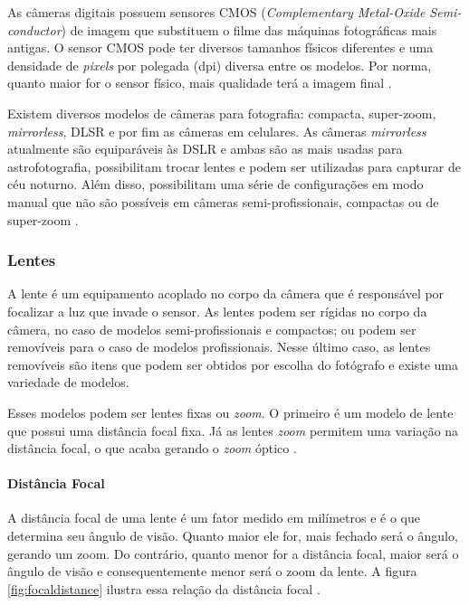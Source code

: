 As câmeras digitais possuem sensores CMOS (\textit{Complementary Metal-Oxide Semi-conductor}) de imagem que substituem o filme das máquinas fotográficas mais antigas. O sensor CMOS pode ter diversos tamanhos físicos diferentes e uma densidade de \textit{pixels} por polegada (dpi) diversa entre os modelos. Por norma, quanto maior for o sensor físico, mais qualidade terá a imagem final \cite{man:vanessacameras}.

Existem diversos modelos de câmeras para fotografia: compacta, super-zoom, \textit{mirrorless}, DLSR e por fim as câmeras em celulares. As câmeras \textit{mirrorless} atualmente são equiparáveis às DSLR e ambas são as mais usadas para astrofotografia, possibilitam trocar lentes e podem ser utilizadas para capturar de céu noturno. Além disso, possibilitam uma série de configurações em modo manual que não são possíveis em câmeras semi-profissionais, compactas ou de super-zoom \cite{book:bbcsky}.

\subsubsection{Lentes}
A lente é um equipamento acoplado no corpo da câmera que é responsável por focalizar a luz que invade o sensor. As lentes podem ser rígidas no corpo da câmera, no caso de modelos semi-profissionais e compactos; ou podem ser removíveis para o caso de modelos profissionais. Nesse último caso, as lentes removíveis são itens que podem ser obtidos por escolha do fotógrafo e existe uma variedade de modelos.

Esses modelos podem ser lentes fixas ou \textit{zoom}. O primeiro é um modelo de lente que possui uma distância focal fixa. Já as lentes \textit{zoom} permitem uma variação na distância focal, o que acaba gerando o \textit{zoom} óptico \cite{man:claudia7licoes}. 

\paragraph{Distância Focal}

A distância focal de uma lente é um fator medido em milímetros e é o  que determina seu ângulo de visão. Quanto maior ele for, mais fechado será o ângulo, gerando um zoom. Do contrário, quanto menor for a distância focal, maior será o ângulo de visão e consequentemente menor será o zoom da lente. A figura \ref{fig:focaldistance} ilustra essa relação da distância focal \cite{man:claudia7licoes}.

